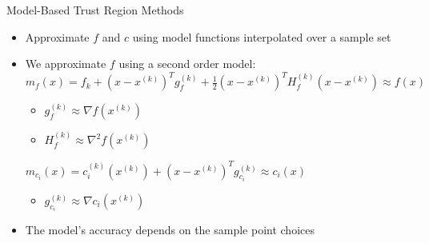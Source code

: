 \documentclass{beamer}
\newcommand{\xk}{{{x}^{(k)}}}
\newcommand{\mk}{{m_f}}
\newcommand{\fk}{{f_k}}
\newcommand{\fgk}{{g^{(k)}_f}}
\newcommand{\fhk}{{H^{(k)}_f}}
\newcommand{\ck}{{c^{(k)}_{i}(\xk)}}
\newcommand{\cgk}{{g^{(k)}_{c_i}}}
\newcommand{\mck}{{m_{c_i}}}
\begin{document}
\begin{frame}{Model-Based Trust Region Methods}
	\begin{itemize}
		\item Approximate $f$ and $c$ using model functions interpolated over a sample set
		\item We approximate $f$ using a second order model: \\
			$\mk(x) = \fk + \left(x - \xk \right)^T\fgk + \frac 1 2 \left(x - \xk \right)^T\fhk\left(x - \xk \right) \approx f(x)$
			\begin{itemize}
				\item $\fgk \approx \nabla f(\xk)$
				\item $\fhk \approx \nabla ^2 f(\xk)$
			\end{itemize}
			$\mck(x) = \ck + \left(x - \xk\right)^T \cgk \approx c_i(x)$ \\
			\begin{itemize}
				\item $\cgk \approx \nabla c_i(\xk)$
			\end{itemize}
		\item The model's accuracy depends on the sample point choices
	\end{itemize}
\end{frame}
\end{document}
